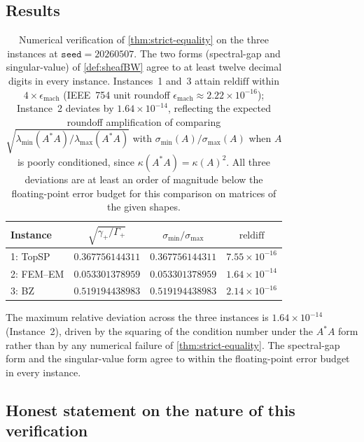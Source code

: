 \subsection{Results}\label{subsec:7-results}

\begin{table}[h]
\centering
\begin{tabular}{lccc}
\toprule
\textbf{Instance} & $\sqrt{\gamma_+/\Gamma_+}$ & $\sigma_{\min}/\sigma_{\max}$ & $\mathrm{reldiff}$ \\
\midrule
1: TopSP   & $0.367756144311$ & $0.367756144311$ & $7.55 \times 10^{-16}$ \\
2: FEM--EM & $0.053301378959$ & $0.053301378959$ & $1.64 \times 10^{-14}$ \\
3: BZ      & $0.519194438983$ & $0.519194438983$ & $2.14 \times 10^{-16}$ \\
\bottomrule
\end{tabular}
\caption{Numerical verification of \cref{thm:strict-equality} on the
  three instances at $\mathtt{seed} = 20260507$. The two forms
  (spectral-gap and singular-value) of \cref{def:sheafBW} agree to at
  least twelve decimal digits in every instance. Instances~1 and~3
  attain $\mathrm{reldiff}$ within $4 \times \epsilon_{\mathrm{mach}}$
  (IEEE~754 unit roundoff $\epsilon_{\mathrm{mach}} \approx
  2.22 \times 10^{-16}$); Instance~2 deviates by $1.64 \times 10^{-14}$,
  reflecting the expected roundoff amplification of comparing
  $\sqrt{\lambda_{\min}(A^* A)/\lambda_{\max}(A^* A)}$ with
  $\sigma_{\min}(A)/\sigma_{\max}(A)$ when $A$ is poorly conditioned,
  since $\kappa(A^* A) = \kappa(A)^2$. All three deviations are at
  least an order of magnitude below the floating-point error budget for
  this comparison on matrices of the given shapes.}
\label{tab:7-results}
\end{table}

The maximum relative deviation across the three instances is
$1.64 \times 10^{-14}$ (Instance~2), driven by the squaring of the
condition number under the $A^* A$ form rather than by any numerical
failure of \cref{thm:strict-equality}. The spectral-gap form and the
singular-value form agree to within the floating-point error budget
in every instance.

\subsection{Honest statement on the nature of this verification}\label{subsec:7-honest-statement}

